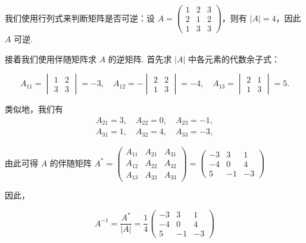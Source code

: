 \begin{solution}
    我们使用行列式来判断矩阵是否可逆：设 $A=\begin{pmatrix}
            1 & 2 & 3 \\ 2 & 1 & 2 \\ 1 & 3 & 3
        \end{pmatrix}$，则有 $|A| = 4$，因此 $A$ 可逆.

    接着我们使用伴随矩阵求 $A$ 的逆矩阵. 首先求 $|A|$ 中各元素的代数余子式：

    \[
        A_{11} = \begin{vmatrix}
            1 & 2 \\ 3 & 3
        \end{vmatrix} = -3, \quad
        A_{12} = - \begin{vmatrix}
            2 & 2 \\ 1 & 3
        \end{vmatrix} = -4, \quad
        A_{13} = \begin{vmatrix}
            2 & 1 \\ 1 & 3
        \end{vmatrix} = 5.
    \]

    类似地，我们有
    \begin{gather*}
        A_{21} = 3, \quad A_{22} = 0, \quad A_{23} = -1, \\
        A_{31} = 1, \quad A_{32} = 4, \quad A_{33} = -3,
    \end{gather*}

    由此可得 $A$ 的伴随矩阵 $A^* = \begin{pmatrix}
            A_{11} & A_{21} & A_{31} \\
            A_{12} & A_{22} & A_{32} \\
            A_{13} & A_{23} & A_{33}
        \end{pmatrix} = \begin{pmatrix}
            -3 & 3 & 1 \\
            -4 & 0 & 4 \\
            5 & -1 & -3
        \end{pmatrix}$

    因此，

    \[
        A^{-1} = \dfrac{A^*}{|A|} = \dfrac{1}{4} \begin{pmatrix}
            -3 & 3 & 1 \\
            -4 & 0 & 4 \\
            5 & -1 & -3
            \end{pmatrix}
    \]

\end{solution}

